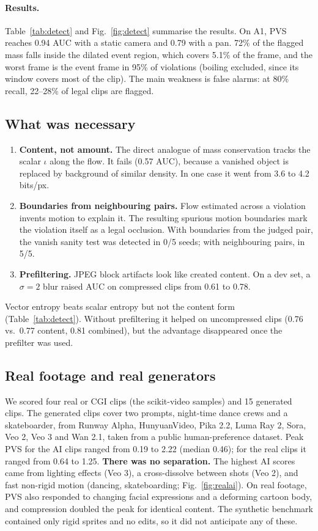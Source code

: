 \documentclass[10pt,twocolumn,letterpaper]{article}
\begin{document}
\paragraph{Results.} Table~\ref{tab:detect} and Fig.~\ref{fig:detect} summarise the results. On A1, PVS reaches 0.94 AUC with a static camera and 0.79 with a pan. 72\% of the flagged mass falls inside the dilated event region, which covers 5.1\% of the frame, and the worst frame is the event frame in 95\% of violations (boiling excluded, since its window covers most of the clip). The main weakness is false alarms: at 80\% recall, 22--28\% of legal clips are flagged.

\subsection{What was necessary}\label{sec:pvs-ablate}
\begin{enumerate}
\item \textbf{Content, not amount.} The direct analogue of mass conservation tracks the scalar $\iota$ along the flow. It fails (0.57 AUC), because a vanished object is replaced by background of similar density. In one case it went from 3.6 to 4.2 bits/px.
\item \textbf{Boundaries from neighbouring pairs.} Flow estimated across a violation invents motion to explain it. The resulting spurious motion boundaries mark the violation itself as a legal occlusion. With boundaries from the judged pair, the vanish sanity test was detected in 0/5 seeds; with neighbouring pairs, in 5/5.
\item \textbf{Prefiltering.} JPEG block artifacts look like created content. On a dev set, a $\sigma{=}2$ blur raised AUC on compressed clips from 0.61 to 0.78.
\end{enumerate}
Vector entropy beats scalar entropy but not the content form (Table~\ref{tab:detect}). Without prefiltering it helped on uncompressed clips (0.76 vs.\ 0.77 content, 0.81 combined), but the advantage disappeared once the prefilter was used.

\subsection{Real footage and real generators}
We scored four real or CGI clips (the scikit-video samples) and 15 generated clips. The generated clips cover two prompts, night-time dance crews and a skateboarder, from Runway Alpha, HunyuanVideo, Pika 2.2, Luma Ray 2, Sora, Veo 2, Veo 3 and Wan 2.1, taken from a public human-preference dataset. Peak PVS for the AI clips ranged from 0.19 to 2.22 (median 0.46); for the real clips it ranged from 0.64 to 1.25. \textbf{There was no separation.} The highest AI scores came from lighting effects (Veo 3), a cross-dissolve between shots (Veo 2), and fast non-rigid motion (dancing, skateboarding; Fig.~\ref{fig:realai}). On real footage, PVS also responded to changing facial expressions and a deforming cartoon body, and compression doubled the peak for identical content. The synthetic benchmark contained only rigid sprites and no edits, so it did not anticipate any of these.
\end{document}

